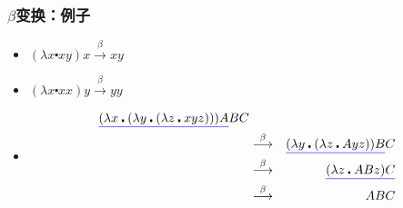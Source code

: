 \documentclass[CJK,compress,hyperref]{beamer}
\begin{document}
\begin{CJK}{UTF8}{song}
\begin{frame}
  \frametitle{$\beta$变换：例子} 
  \begin{itemize}
  \item $(\lambda x \centerdot xy) x \stackrel{\beta}{\longrightarrow} xy$
  \item $(\lambda x \centerdot xx) y \stackrel{\beta}{\longrightarrow} yy$
  \item  
    \begin{eqnarray*}
      {\color{blue}\underline{{\color{black}(\lambda x \centerdot (\lambda y \centerdot (\lambda z \centerdot xyz)))A}}}BC & & \\
                                                                                                                           & \stackrel{\beta}{\longrightarrow} & {\color{blue}\underline{{\color{black}(\lambda y \centerdot (\lambda z \centerdot Ayz))B}}}C \\
                                                                                                                           & \stackrel{\beta}{\longrightarrow} & {\color{blue}\underline{{\color{black}(\lambda z \centerdot ABz)C}}} \\ 
                                                                                                                           & \stackrel{\beta}{\longrightarrow} & ABC 
    \end{eqnarray*} 
  \end{itemize}
\end{frame} 


\end{CJK}
\end{document}
